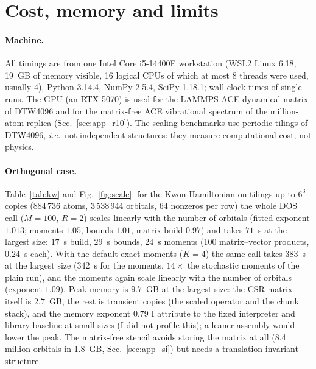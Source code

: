 \documentclass[reprint,nofootinbib,superscriptaddress,amsmath,amssymb,aps,prb,floatfix]{revtex4-2}
\newcommand{\ie}{\emph{i.e.}}
\begin{document}
\section{Cost, memory and limits}
\label{sec:cost}
\label{sec:scaling}

\paragraph*{Machine.}
All timings are from one Intel Core i5-14400F workstation (WSL2 Linux 6.18, 19~GB of memory visible, 16 logical CPUs of which at most 8 threads were used, usually 4), Python 3.14.4, NumPy 2.5.4, SciPy 1.18.1; wall-clock times of single runs.
The GPU (an RTX 5070) is used for the LAMMPS ACE dynamical matrix of DTW4096 and for the matrix-free ACE vibrational spectrum of the million-atom replica (Sec.~\ref{sec:app_r10}).
The scaling benchmarks use periodic tilings of DTW4096, \ie\ not independent structures: they measure computational cost, not physics.

\paragraph*{Orthogonal case.}
Table~\ref{tab:kw} and Fig.~\ref{fig:scale}: for the Kwon Hamiltonian on tilings up to $6^3$ copies (884\,736 atoms, 3\,538\,944 orbitals, 64 nonzeros per row) the whole DOS call ($M=100$, $R=2$) scales linearly with the number of orbitals (fitted exponent $1.013$; moments $1.05$, bounds $1.01$, matrix build $0.97$) and takes $71$~s at the largest size: $17$~s build, $29$~s bounds, $24$~s moments (100 matrix--vector products, $0.24$~s each). With the default exact moments ($K=4$) the same call takes $383$~s at the largest size ($342$~s for the moments, $14\times$ the stochastic moments of the plain run), and the moments again scale linearly with the number of orbitals (exponent $1.09$).
Peak memory is $9.7$~GB at the largest size: the CSR matrix itself is $2.7$~GB, the rest is transient copies (the scaled operator and the chunk stack), and the memory exponent $0.79$ I attribute to the fixed interpreter and library baseline at small sizes (I did not profile this); a leaner assembly would lower the peak.
The matrix-free stencil avoids storing the matrix at all (8.4 million orbitals in 1.8~GB, Sec.~\ref{sec:app_si}) but needs a translation-invariant structure.


\end{document}
